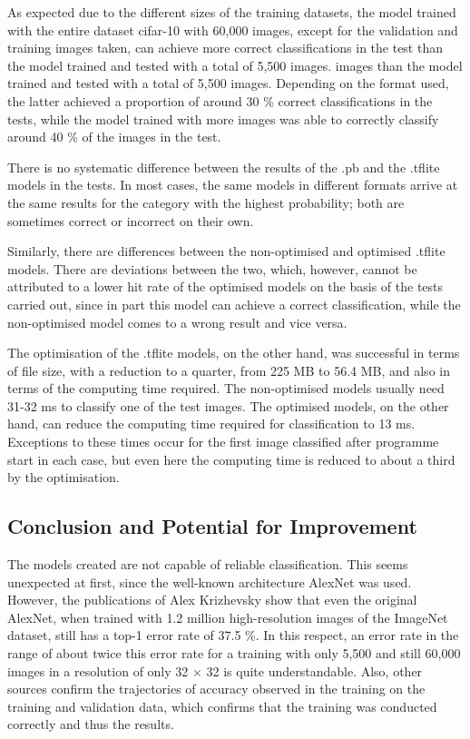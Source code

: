 As expected due to the different sizes of the training datasets, the model trained with the entire dataset \ac{cifar}-10 with 60,000 images, except for the validation and training images taken, can achieve more correct classifications in the test than the model trained and tested with a total of 5,500 images.
images than the model trained and tested with a total of 5,500 images. Depending on the format used, the latter achieved a proportion of around 30 \% correct classifications in the tests, while the model trained with more images was able to correctly classify around 40 \% of the images in the test.

There is no systematic difference between the results of the .pb and the .tflite models in the tests. In most cases, the same models in different formats arrive at the same results for the category with the highest probability; both are sometimes correct or incorrect on their own.


Similarly, there are differences between the non-optimised and optimised .tflite models. There are deviations between the two, which, however, cannot be attributed to a lower hit rate of the optimised models on the basis of the tests carried out, since in part this model can achieve a correct classification, while the non-optimised model comes to a wrong result and vice versa.


The optimisation of the .tflite models, on the other hand, was successful in terms of file size, with a reduction to a quarter, from 225 MB to 56.4 MB, and also in terms of the computing time required. The non-optimised models usually need 31-32 ms to classify one of the test images. The optimised models, on the other hand, can reduce the computing time required for classification to 13 ms. Exceptions to these times occur for the first image classified after programme start in each case, but even here the computing time is reduced to about a third by the optimisation.





\subsection{Conclusion and Potential for Improvement}

The models created are not capable of reliable classification. This seems unexpected at first, since the well-known architecture AlexNet was used. However, the publications of Alex Krizhevsky \cite{Krizhevsky:2012} show that even the original AlexNet, when trained with 1.2 million high-resolution images of the ImageNet dataset, still has a top-1 error rate of 37.5 \%. In this respect, an error rate in the range of about twice this error rate for a training with only 5,500 and still 60,000 images in a resolution of only 32 $\times$ 32 is quite understandable. Also, other sources confirm the trajectories of accuracy observed in the training on the training and validation data, which confirms that the training was conducted correctly and thus the results.\cite{Varshney:2020}

